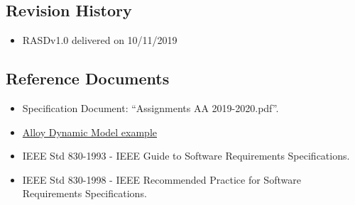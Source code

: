 \subsection {Revision History}
\begin{itemize}
\item	RASDv1.0 delivered on 10/11/2019
\end{itemize}
\subsection {Reference Documents}
\begin{itemize}
\item	Specification Document: “Assignments AA 2019-2020.pdf”.
\item	\href{http://homepage.cs.uiowa.edu/~tinelli/classes/181/Spring10/Notes/09-dynamic-models.pdf }{Alloy Dynamic Model example} 
\item	IEEE Std 830-1993 - IEEE Guide to Software Requirements Specifications.
\item	IEEE Std 830-1998 - IEEE Recommended Practice for Software Requirements Specifications.

\end{itemize}
